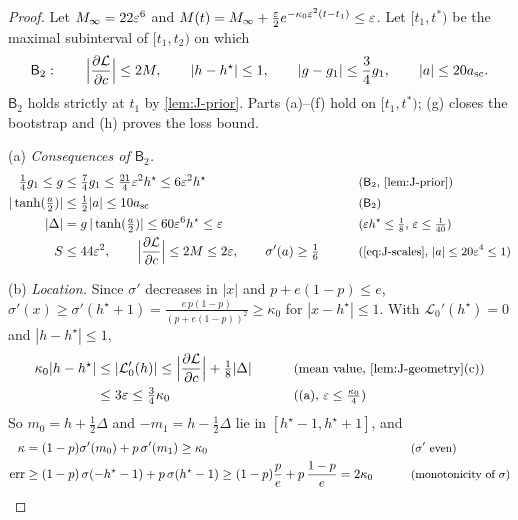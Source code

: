 \begin{proof}
Let $M_\infty=22\varepsilon^6$ and $M(t)=M_\infty+\frac{\varepsilon}{2}e^{-\kappa_0\varepsilon^2(t-t_1)}\le\varepsilon$. Let $[t_1,t^\ast)$ be the maximal subinterval of
$[t_1,t_2)$ on which
\[
 \mathsf B_2:\qquad \Bigl|\pd{\mathcal L}{c}\Bigr|\le2M,\qquad |h-h^\star|\le1,\qquad |g-g_1|\le\frac{3}{4}g_1,\qquad |a|\le20a_{\mathrm{sc}} .
\]
$\mathsf B_2$ holds strictly at $t_1$ by \cref{lem:J-prior}. Parts (a)--(f) hold on $[t_1,t^\ast)$; (g) closes the bootstrap and (h) proves the loss bound.

\smallskip\noindent(a) \emph{Consequences of $\mathsf B_2$.}
\begin{alignat*}{2}
 \tfrac{1}{4}g_1\le g&\le\tfrac{7}{4}g_1\le\tfrac{21}{4}\initscale^2h^\star\le6\initscale^2h^\star &\qquad& \why{$\mathsf B_2$, \cref{lem:J-prior}}\\
 |\tanh(\tfrac{a}{2})|&\le\tfrac{1}{2}|a|\le10a_{\mathrm{sc}} && \why{$\mathsf B_2$}\\
 |\Delta|&=g\,|\tanh(\tfrac{a}{2})|\le60\initscale^6h^\star\le\initscale && \why{$\initscale h^\star\le\tfrac{1}{8}$, $\initscale\le\tfrac{1}{40}$}\\
 S&\le44\initscale^2,\qquad \Bigl|\pd{\mathcal L}{c}\Bigr|\le2M\le2\initscale,\qquad \sigma'(a)\ge\tfrac{1}{6} && \why{\cref{eq:J-scales}, $|a|\le20\initscale^4\le1$}
\end{alignat*}

\noindent(b) \emph{Location.} Since $\sigma'$ decreases in $|x|$ and $p+e(1-p)\le e$, $\sigma'(x)\ge\sigma'(h^\star+1)=\frac{e\,p(1-p)}{(p+e(1-p))^2}\ge\kappa_0$
for $|x-h^\star|\le1$. With $\mathcal L_0'(h^\star)=0$ and $|h-h^\star|\le1$,
\begin{alignat*}{2}
 \kappa_0|h-h^\star|&\le|\mathcal L_0'(h)|\le\Bigl|\pd{\mathcal L}{c}\Bigr|+\tfrac{1}{8}|\Delta| &\qquad& \why{mean value, \cref{lem:J-geometry}(c)}\\
 &\le3\initscale\le\tfrac{3}{4}\kappa_0 && \why{(a), $\initscale\le\tfrac{\kappa_0}{4}$}
\end{alignat*}
So $m_0=h+\frac{1}{2}\Delta$ and $-m_1=h-\frac{1}{2}\Delta$ lie in $[h^\star-1,h^\star+1]$, and
\begin{alignat*}{2}
 \kappa&=(1-p)\sigma'(m_0)+p\,\sigma'(m_1)\ge\kappa_0 &\qquad& \text{\small($\sigma'$ even)}\\
 \mathrm{err}&\ge(1-p)\,\sigma(-h^\star-1)+p\,\sigma(h^\star-1)\ge(1-p)\frac{p}{e}+p\,\frac{1-p}{e}=2\kappa_0 && \text{\small(monotonicity of $\sigma$)}
\end{alignat*}


\end{proof}
